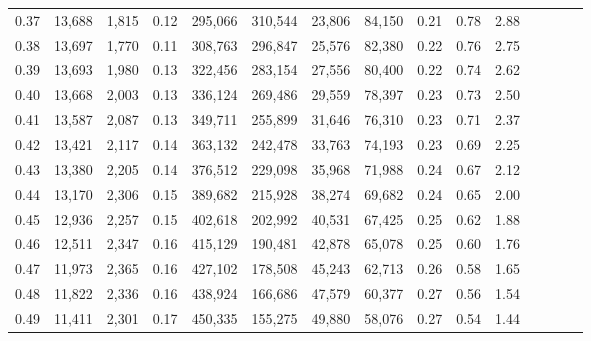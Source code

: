\begin{tabular}{rrrcrrrrrrrrrrr}
0.37 &  13,688 &  1,815 &                                       0.12 &  295,066 &  310,544 &   23,806 &   84,150 &  0.21 &  0.78 &                         2.88 \\
0.38 &  13,697 &  1,770 &                                       0.11 &  308,763 &  296,847 &   25,576 &   82,380 &  0.22 &  0.76 &                         2.75 \\
0.39 &  13,693 &  1,980 &                                       0.13 &  322,456 &  283,154 &   27,556 &   80,400 &  0.22 &  0.74 &                         2.62 \\
0.40 &  13,668 &  2,003 &                                       0.13 &  336,124 &  269,486 &   29,559 &   78,397 &  0.23 &  0.73 &                         2.50 \\
0.41 &  13,587 &  2,087 &                                       0.13 &  349,711 &  255,899 &   31,646 &   76,310 &  0.23 &  0.71 &                         2.37 \\
0.42 &  13,421 &  2,117 &                                       0.14 &  363,132 &  242,478 &   33,763 &   74,193 &  0.23 &  0.69 &                         2.25 \\
0.43 &  13,380 &  2,205 &                                       0.14 &  376,512 &  229,098 &   35,968 &   71,988 &  0.24 &  0.67 &                         2.12 \\
0.44 &  13,170 &  2,306 &                                       0.15 &  389,682 &  215,928 &   38,274 &   69,682 &  0.24 &  0.65 &                         2.00 \\
0.45 &  12,936 &  2,257 &                                       0.15 &  402,618 &  202,992 &   40,531 &   67,425 &  0.25 &  0.62 &                         1.88 \\
0.46 &  12,511 &  2,347 &                                       0.16 &  415,129 &  190,481 &   42,878 &   65,078 &  0.25 &  0.60 &                         1.76 \\
0.47 &  11,973 &  2,365 &                                       0.16 &  427,102 &  178,508 &   45,243 &   62,713 &  0.26 &  0.58 &                         1.65 \\
0.48 &  11,822 &  2,336 &                                       0.16 &  438,924 &  166,686 &   47,579 &   60,377 &  0.27 &  0.56 &                         1.54 \\
0.49 &  11,411 &  2,301 &                                       0.17 &  450,335 &  155,275 &   49,880 &   58,076 &  0.27 &  0.54 &                         1.44 \\

\end{tabular}
